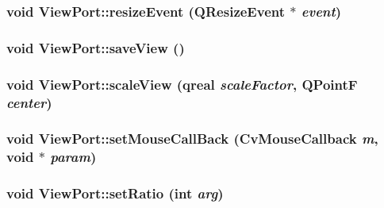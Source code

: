 \label{classViewPort_af9e56726827ee1679b536d90586b3add}
\hypertarget{classViewPort_a7a1fec5745e2bd12c11f0f4a8c17183f}{
\subsubsection[{resizeEvent}]{\setlength{\rightskip}{0pt plus 5cm}void ViewPort::resizeEvent (QResizeEvent $\ast$ {\em event})}}
\label{classViewPort_a7a1fec5745e2bd12c11f0f4a8c17183f}
\hypertarget{classViewPort_a69445bb6b5b203923b6707b583cdc0d8}{
\subsubsection[{saveView}]{\setlength{\rightskip}{0pt plus 5cm}void ViewPort::saveView ()}}
\label{classViewPort_a69445bb6b5b203923b6707b583cdc0d8}
\hypertarget{classViewPort_af68a292bada1aadd5b3cbcd5cd86620c}{
\subsubsection[{scaleView}]{\setlength{\rightskip}{0pt plus 5cm}void ViewPort::scaleView (qreal {\em scaleFactor}, \/  QPointF {\em center})}}
\label{classViewPort_af68a292bada1aadd5b3cbcd5cd86620c}
\hypertarget{classViewPort_a725688baa203c6247e9a147acaa7597a}{
\subsubsection[{setMouseCallBack}]{\setlength{\rightskip}{0pt plus 5cm}void ViewPort::setMouseCallBack (CvMouseCallback {\em m}, \/  void $\ast$ {\em param})}}
\label{classViewPort_a725688baa203c6247e9a147acaa7597a}
\hypertarget{classViewPort_ad250b6cf4dd6d571128a7ad0d4d98175}{
\subsubsection[{setRatio}]{\setlength{\rightskip}{0pt plus 5cm}void ViewPort::setRatio (int {\em arg})}}
